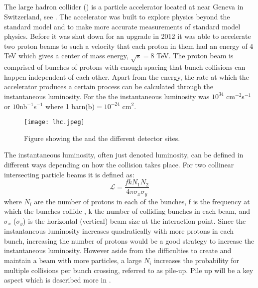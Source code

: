 \subsection{\abbrLHC}
The large hadron collider (\abbrLHC) is a particle accelerator located at \abbrCERN near Geneva in Switzerland, see . The accelerator was built to explore physics beyond the standard model and to make more accurate measurements of standard model physics. Before it was shut down for an upgrade in 2012 it was able to accelerate two proton beams to such a velocity that each proton in them had an energy of 4 TeV which gives a center of mass energy, $\sqrt{s}=8$ TeV. The proton beam is comprised of bunches of protons with enough spacing that bunch collisions can happen independent of each other. Apart from the energy, the rate at which the accelerator produces a certain process can be calculated through the instantaneous luminosity. For the \abbrLHC the instantaneous luminosity was $10^{34}$ cm$^{-2}$s$^{-1}$ \citep{lumires} or $10$nb$^{-1}$s$^{-1}$ where 1 barn(b)$=10^{-24}$ cm$^2$.
\begin{figure}[H]
\begin{center}
\texttt{[image: lhc.jpeg]}
\caption{Figure showing the \abbrLHC and the different detector sites\citep{lhcimage}.}
\label{fig:lhc}
\end{center}
\end{figure}
The instantaneous luminosity, often just denoted luminosity, can be defined in different ways depending on how the collision takes place. For two collinear intersecting particle beams it is defined as:
\begin{equation}
\mathscr{L} = \frac{fkN_1 N_2}{4\pi \sigma_x \sigma_y}
\end{equation}
where $N_i$ are the number of protons in each of the bunches, f is the frequency at which the bunches collide , k the number of colliding bunches in each beam, and $\sigma_x$ ($\sigma_y$) is the horizontal (vertical) beam size at the interaction point. Since the instantaneous luminosity increases quadratically with more protons in each bunch, increasing the number of protons would be a good strategy to increase the instantaneous luminosity. However aside from the difficulties to create and maintain a beam with more particles, a large $N_i$ increases the probability for multiple collisions per bunch crossing, referred to as pile-up. Pile up will be a key aspect which is described more in . 

